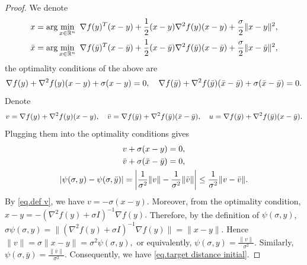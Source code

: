 \documentclass{article}
\begin{document}
\begin{proof}
    We denote
    \begin{gather*}
        x = \arg\min_{x\in \mathbb{R}^n} \ \nabla f(y)^T(x-y) +\frac{1}{2}(x-y)\nabla ^2 f(y)(x-y) +\frac{\sigma}{2}\|x-y\|^2,\\
        \Bar{x} = \arg\min_{x\in \mathbb{R}^n} \ \nabla f(\Bar{y})^T(x-\Bar{y}) +\frac{1}{2}(x-\Bar{y})\nabla ^2 f(\Bar{y})(x-\Bar{y}) +\frac{\sigma}{2}\|x-\Bar{y}\|^2,
    \end{gather*}
    the optimality conditions of the above are
    \begin{equation*}
        \nabla f(y) + \nabla ^2 f(y)(x-y) +\sigma(x-y)=0,\quad
        \nabla f(\Bar{y})+\nabla ^2 f(\Bar{y})(\Bar{x}-\Bar{y})+\sigma(\Bar{x}-\Bar{y})=0.
    \end{equation*}
    Denote
    \begin{equation*}
        v = \nabla f(y) + \nabla ^2 f(y)(x-y),\quad
        \Bar{v} =  \nabla f(\Bar{y})+\nabla ^2 f(\Bar{y})(\Bar{x}-\Bar{y}),\quad
        u = \nabla f(\Bar{y})+\nabla ^2 f(\Bar{y})(x-\Bar{y}).
    \end{equation*}
    Plugging them into the optimality conditions gives
    \begin{gather}
        \label{eq.def v}
        v+\sigma(x-y)=0,\\
        \label{eq.def bar v}
        \Bar{v}+\sigma(\Bar{x}-\Bar{y})=0,\\
        \label{eq.target distance initial}
        \left \vert \psi(\sigma,y)-\psi(\sigma,\Bar{y}) \right\vert= \left \vert\frac{1}{\sigma^2}\|v\| -\frac{1}{\sigma^2}\|\Bar{v}\|\right\vert\leq \frac{1}{\sigma^2}\|v-\Bar{v}\|.
    \end{gather}
    By \eqref{eq.def v}, we have
    \(
    v=-\sigma(x-y).
    \)
    Moreover, from the optimality condition,
    \(
    x-y=-(\nabla^2 f(y)+\sigma I)^{-1}\nabla f(y).
    \)
    Therefore, by the definition of \(\psi(\sigma,y)\),
    \(
    \sigma\psi(\sigma,y)
    =
    \|(\nabla^2 f(y)+\sigma I)^{-1}\nabla f(y)\|
    =
    \|x-y\|.
    \)
    Hence
    \(
    \|v\|
    =
    \sigma\|x-y\|
    =
    \sigma^2\psi(\sigma,y),
    \)
    or equivalently,
    \(
    \psi(\sigma,y)=\frac{\|v\|}{\sigma^2}.
    \)
    Similarly, \(\psi(\sigma,\bar y)=\frac{\|\bar v\|}{\sigma^2}. \)
    Consequently, we have \eqref{eq.target distance initial}.


\end{proof}
\end{document}
